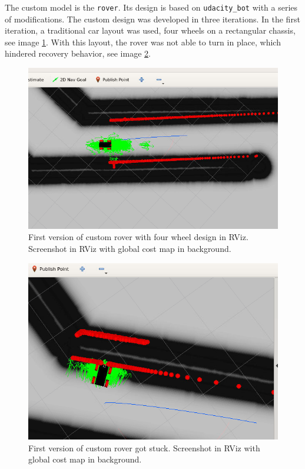 \documentclass[10pt,journal,compsoc]{IEEEtran}
\begin{document}
The custom model is the \texttt{rover}. Its design is based on \texttt{udacity\_bot} with a series of modifications. The custom design was developed in three iterations. In the first iteration, a traditional car layout was used, four wheels on a rectangular chassis, see image \ref{fig:rover_1_design}. With this layout, the rover was not able to turn in place, which hindered recovery behavior, see image \ref{fig:rover_1_stuck}.
\begin{figure}[thpb]
      \centering
      \includegraphics[width=\columnwidth]{images/rover_version_1_1_small.png}
      \caption{First version of custom rover with four wheel design in RViz. Screenshot in RViz with global cost map in background.}
      \label{fig:rover_1_design}
\end{figure}
\begin{figure}[thpb]
      \centering
      \includegraphics[width=\columnwidth]{images/rover_version_1_5_small.png}
      \caption{First version of custom rover got stuck. Screenshot in RViz with global cost map in background.}
      \label{fig:rover_1_stuck}
\end{figure}
\end{document}
